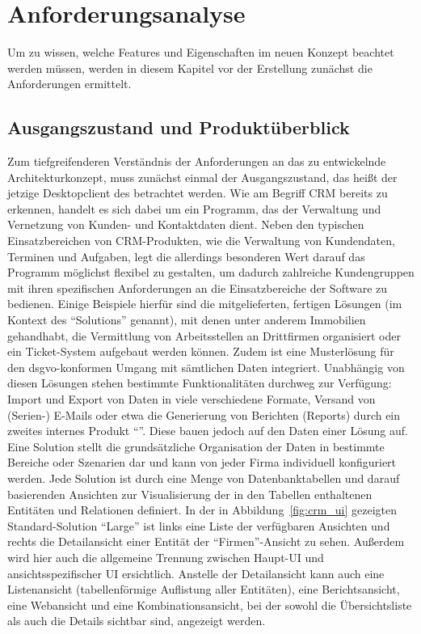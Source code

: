 \chapter{Anforderungsanalyse}\label{chap:requirements}
Um zu wissen, welche Features und Eigenschaften im neuen Konzept beachtet werden müssen, werden in diesem Kapitel vor der Erstellung zunächst die Anforderungen ermittelt.

\section{Ausgangszustand und Produktüberblick}\label{sec:product_overview}
Zum tiefgreifenderen Verständnis der Anforderungen an das zu entwickelnde Architekturkonzept, muss zunächst einmal der Ausgangszustand, das heißt der jetzige Desktopclient des  betrachtet werden. Wie am Begriff \gls{CRM} bereits zu erkennen, handelt es sich dabei um ein Programm, das der Verwaltung und Vernetzung von Kunden- und Kontaktdaten dient. Neben den typischen Einsatzbereichen von \gls{CRM}-Produkten, wie die Verwaltung von Kundendaten, Terminen und Aufgaben, legt die  allerdings besonderen Wert darauf das Programm möglichst flexibel zu gestalten, um dadurch zahlreiche Kundengruppen mit ihren spezifischen Anforderungen an die Einsatzbereiche der Software zu bedienen. Einige Beispiele hierfür sind die mitgelieferten, fertigen Lösungen (im Kontext des  \enquote{Solutions} genannt), mit denen unter anderem Immobilien gehandhabt, die Vermittlung von Arbeitsstellen an Drittfirmen organisiert oder ein Ticket-System aufgebaut werden können. Zudem ist eine Musterlösung für den \gls{dsgvo}-konformen Umgang mit sämtlichen Daten integriert. Unabhängig von diesen Lösungen stehen bestimmte Funktionalitäten durchweg zur Verfügung: Import und Export von Daten in viele verschiedene Formate, Versand von (Serien-) E-Mails oder etwa die Generierung von Berichten (Reports) durch ein zweites internes Produkt \enquote{}. Diese bauen jedoch auf den Daten einer Lösung auf.
Eine Solution stellt die grundsätzliche Organisation der Daten in bestimmte Bereiche oder Szenarien dar und kann von jeder Firma individuell konfiguriert werden. Jede Solution ist durch eine Menge von Datenbanktabellen und darauf basierenden Ansichten zur Visualisierung der in den Tabellen enthaltenen Entitäten und Relationen definiert. In der in Abbildung~\ref{fig:crm_ui} gezeigten Standard-Solution \enquote{Large} ist links eine Liste der verfügbaren Ansichten und rechts die Detailansicht einer Entität der \enquote{Firmen}-Ansicht zu sehen. Außerdem wird hier auch die allgemeine Trennung zwischen Haupt-UI und ansichtsspezifischer UI ersichtlich. Anstelle der Detailansicht kann auch eine Listenansicht (tabellenförmige Auflistung aller Entitäten), eine Berichtsansicht, eine Webansicht und eine Kombinationsansicht, bei der sowohl die Übersichtsliste als auch die Details sichtbar sind, angezeigt werden.

